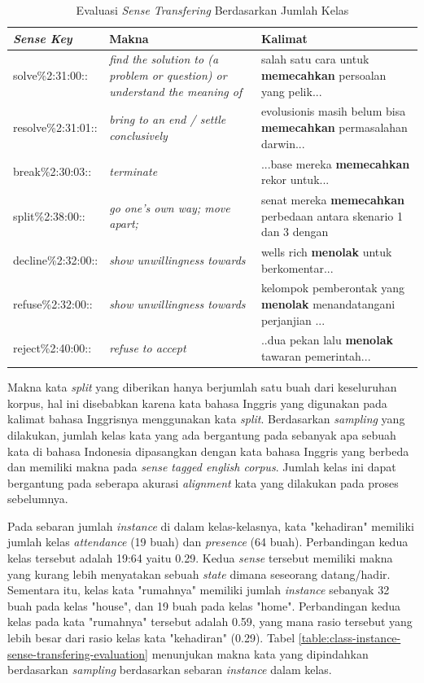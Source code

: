 \begin{table}
	\centering
	\caption{Evaluasi \textit{Sense Transfering} Berdasarkan Jumlah Kelas}
	\label{table:number-classes-sense-transfering-evaluation}
	\begin{tabular}{|p{4cm}|p{4cm}|p{4cm}|}
		\hline
		\textit{Sense Key} & Makna & Kalimat
		\\ \hline
		solve\%2:31:00::  & 
		\textit{find the solution to (a problem or question) or understand the meaning of}   & 
		salah satu cara untuk \textbf{memecahkan} persoalan yang pelik...
		\\ \hline
		resolve\%2:31:01:: & 
		\textit{bring to an end / settle conclusively}   & 
		evolusionis masih belum bisa \textbf{memecahkan} permasalahan darwin...
		\\ \hline
		break\%2:30:03:: & 
		\textit{terminate}   & 
		...base mereka \textbf{memecahkan} rekor untuk...
		\\ \hline
		split\%2:38:00:: &
		\textit{go one's own way; move apart;} &
		senat mereka \textbf{memecahkan} perbedaan antara skenario 1 dan 3 dengan
		\\ \hline
		decline\%2:32:00:: &
		\textit{show unwillingness towards} &
		wells rich \textbf{menolak} untuk berkomentar...
		\\ \hline
		refuse\%2:32:00:: &
		\textit{show unwillingness towards} &
		kelompok pemberontak yang \textbf{menolak} menandatangani perjanjian ...
		\\ \hline
		reject\%2:40:00:: &
		\textit{refuse to accept} &
		..dua pekan lalu \textbf{menolak} tawaran pemerintah...
		\\ \hline
	\end{tabular}
\end{table}

Makna kata \textit{split} yang diberikan hanya berjumlah satu buah dari keseluruhan korpus, hal ini disebabkan karena kata bahasa Inggris yang digunakan pada kalimat bahasa Inggrisnya menggunakan kata \textit{split}. Berdasarkan \textit{sampling} yang dilakukan, jumlah kelas kata yang ada bergantung pada sebanyak apa sebuah kata di bahasa Indonesia dipasangkan dengan kata bahasa Inggris yang berbeda dan memiliki makna pada \textit{sense tagged english corpus}. Jumlah kelas ini dapat bergantung pada seberapa akurasi \textit{alignment} kata yang dilakukan pada proses sebelumnya.

Pada sebaran jumlah \textit{instance} di dalam kelas-kelasnya, kata "kehadiran" memiliki jumlah kelas \textit{attendance} (19 buah) dan \textit{presence} (64 buah). Perbandingan kedua kelas tersebut adalah 19:64 yaitu 0.29. Kedua \textit{sense} tersebut memiliki makna yang kurang lebih menyatakan sebuah \textit{state} dimana seseorang datang/hadir. Sementara itu, kelas kata "rumahnya" memiliki jumlah \textit{instance} sebanyak 32 buah pada kelas "house", dan 19 buah pada kelas "home". Perbandingan kedua kelas pada kata "rumahnya" tersebut adalah 0.59, yang mana rasio tersebut yang lebih besar dari rasio kelas kata "kehadiran" (0.29). Tabel \ref{table:class-instance-sense-transfering-evaluation} menunjukan makna kata yang dipindahkan berdasarkan \textit{sampling} berdasarkan sebaran \textit{instance} dalam kelas.

